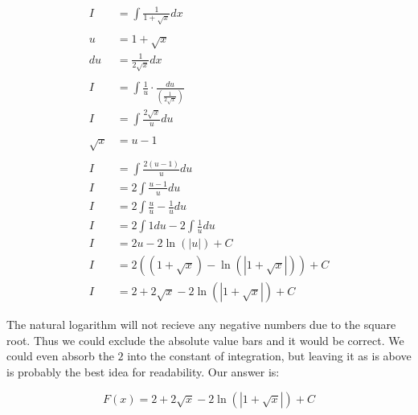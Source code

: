 \documentclass[12pt]{article}
\begin{document}
\begin{align}
    I        & = \int \frac{1}{1+\sqrt{x}} dx                                       \\
    \nonumber                                                                       \\
    u        & = 1+\sqrt{x}                                                         \\
    du       & = \frac{1}{2\sqrt{x}} dx                                             \\
    \nonumber                                                                       \\
    I        & = \int \frac{1}{u} \cdot \frac{du}{\left(\frac{1}{2\sqrt{x}}\right)} \\
    I        & = \int \frac{2\sqrt{x}}{u} du                                        \\
    \nonumber                                                                       \\
    \sqrt{x} & = u - 1                                                              \\
    \nonumber                                                                       \\
    I        & = \int \frac{2(u-1)}{u} du                                           \\
    I        & = 2\int \frac{u-1}{u} du                                             \\
    I        & = 2\int \frac{u}{u} - \frac{1}{u} du                                 \\
    I        & = 2\int 1 du - 2\int \frac{1}{u} du                                  \\
    I        & = 2u - 2\ln(|u|) + C                                                 \\
    I        & = 2((1+\sqrt{x}) - \ln(|1+\sqrt{x}|)) + C                            \\
    I        & = 2 + 2\sqrt{x} - 2\ln(|1+\sqrt{x}|) + C
\end{align}


The natural logarithm will not recieve any negative numbers due to the square root.
Thus we could exclude the absolute value bars and it would be correct.
We could even absorb the $2$ into the constant of integration, but leaving it as is above is probably the best idea for readability.
Our answer is:

$$
    F(x) = 2 + 2\sqrt{x} - 2\ln(|1+\sqrt{x}|) + C
$$
\end{document}
